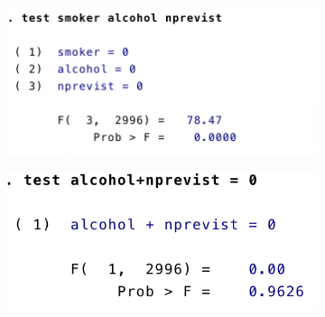 \begin{figure}[H]
\begin{center}
        \begin{subfigure}[b]{0.45\textwidth}
	\centering
                \includegraphics[width=\linewidth]{test}
        \end{subfigure}
        \begin{subfigure}[b]{0.45\textwidth}
	\centering
                \includegraphics[width=\linewidth]{test1}
        \end{subfigure}
\end{center}
\end{figure}



